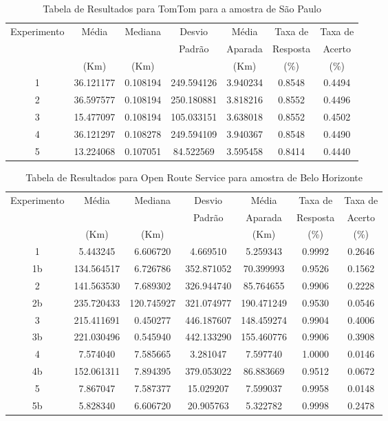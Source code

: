 \begin{anexosenv}
\begin{table}[ht]
    \centering
    \begin{tabular}{|c|c|c|c|c|c|c|}
    \hline
    Experimento & Média & Mediana & Desvio & Média & Taxa de & Taxa de \\
        & & & Padrão & Aparada & Resposta & Acerto \\
        & (Km) & (Km) & & (Km) & (\%) & (\%) \\ \hline
    1 & 36.121177 & 0.108194 & 249.594126 & 3.940234 & 0.8548 & 0.4494 \\ \hline
    2 & 36.597577 & 0.108194 & 250.180881 & 3.818216 & 0.8552 & 0.4496 \\ \hline
    3 & 15.477097 & 0.108194 & 105.033151 & 3.638018 & 0.8552 & 0.4502 \\ \hline
    4 & 36.121297 & 0.108278 & 249.594109 & 3.940367 & 0.8548 & 0.4490 \\ \hline
    5 & 13.224068 & 0.107051 & 84.522569 & 3.595458 & 0.8414 & 0.4440 \\ \hline
    \end{tabular}
    \caption{Tabela de Resultados para TomTom para a amostra de São Paulo}
    \label{tab:tomtomSP}
\end{table}

\begin{table}[ht]
\centering
\begin{tabular}{|c|c|c|c|c|c|c|}
\hline
Experimento & Média & Mediana & Desvio & Média & Taxa de & Taxa de \\
 & & & Padrão & Aparada & Resposta & Acerto \\
 & (Km) & (Km) & & (Km) & (\%) & (\%) \\ \hline
1 & 5.443245 & 6.606720 & 4.669510 & 5.259343 & 0.9992 & 0.2646 \\ \hline
1b & 134.564517 & 6.726786 & 352.871052 & 70.399993 & 0.9526 & 0.1562 \\ \hline
2 & 141.563530 & 7.689302 & 326.944740 & 85.764655 & 0.9906 & 0.2228 \\ \hline
2b & 235.720433 & 120.745927 & 321.074977 & 190.471249 & 0.9530 & 0.0546 \\ \hline
3 & 215.411691 & 0.450277 & 446.187607 & 148.459274 & 0.9904 & 0.4006 \\ \hline
3b & 221.030496 & 0.545940 & 442.133290 & 155.460776 & 0.9906 & 0.3908 \\ \hline
4 & 7.574040 & 7.585665 & 3.281047 & 7.597740 & 1.0000 & 0.0146 \\ \hline
4b & 152.061311 & 7.894395 & 379.053022 & 86.883669 & 0.9512 & 0.0672 \\ \hline
5 & 7.867047 & 7.587377 & 15.029207 & 7.599037 & 0.9958 & 0.0148 \\ \hline
5b & 5.828340 & 6.606720 & 20.905763 & 5.322782 & 0.9998 & 0.2478 \\ \hline
\end{tabular}
\caption{Tabela de Resultados para Open Route Service para amostra de Belo Horizonte}
\label{tab:orsBH}
\end{table}



\end{anexosenv}
